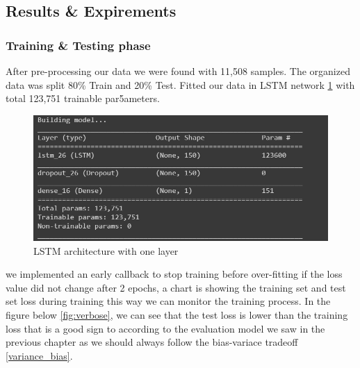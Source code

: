 \subsection{Results \& Expirements}

\subsubsection{Training \& Testing phase }
After pre-processing our data we were found with 11,508 samples. The organized data was split 80\% Train and 20\%  Test. Fitted  our data in  LSTM network \ref{fig:lstm-150} with total 123,751 trainable par5ameters.
%
\begin{figure}[H]
\centering
\includegraphics[width=.9\textwidth]{img/lstm_150.PNG}  
\caption{LSTM architecture with one layer}
\label{fig:lstm-150}
\end{figure}
%

we implemented an early callback to stop training before over-fitting if the loss value did not change after 2 epochs, a chart is showing the training set and test set loss during training this way we can monitor the training process.
In the figure below \ref{fig:verbose}, we can see that the test loss is lower than the training loss that is a good sign to  according to the evaluation model we saw in the previous chapter as we should always follow the bias-variace tradeoff \ref{variance_bias}.

